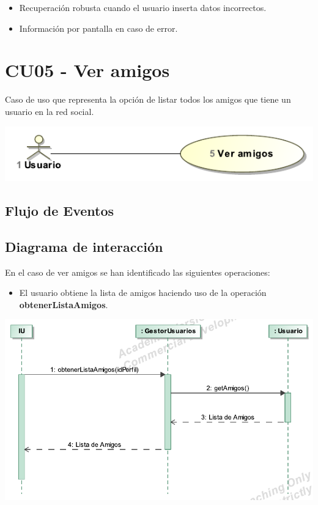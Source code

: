 \documentclass[12pt, a4paper, titlepage]{article}
\begin{document}
\begin{itemize}
	\item Recuperación robusta cuando el usuario inserta datos incorrectos.
	\item Información por pantalla en caso de error.
\end{itemize}

\section{CU05 - Ver amigos}


Caso de uso que representa la opción de listar todos los amigos que tiene un usuario en la red social.

\begin{center}
	\includegraphics{Imagenes/VerAmigosCU.pdf}
\end{center}
\subsection{Flujo de Eventos}


\subsection{Diagrama de interacción}

En el caso de {\sc ver amigos } se han identificado las siguientes operaciones:

\begin{itemize}
	\item El usuario obtiene la lista de amigos haciendo uso de la operación \textbf{obtenerListaAmigos}.
\end{itemize}

\begin{center}
	\includegraphics{Imagenes/OperacionObtenerListaAmigos}
\end{center}
\end{document}
